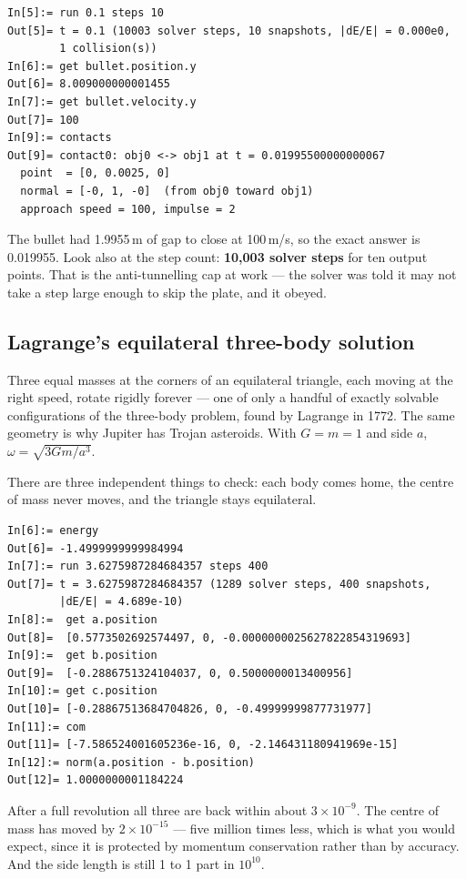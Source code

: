 \documentclass[11pt]{article}
\begin{document}
\begin{lstlisting}
In[5]:= run 0.1 steps 10
Out[5]= t = 0.1 (10003 solver steps, 10 snapshots, |dE/E| = 0.000e0,
        1 collision(s))
In[6]:= get bullet.position.y
Out[6]= 8.009000000001455
In[7]:= get bullet.velocity.y
Out[7]= 100
In[9]:= contacts
Out[9]= contact0: obj0 <-> obj1 at t = 0.01995500000000067
  point  = [0, 0.0025, 0]
  normal = [-0, 1, -0]  (from obj0 toward obj1)
  approach speed = 100, impulse = 2
\end{lstlisting}

The bullet had 1.9955\,m of gap to close at 100\,m/s, so the exact
answer is 0.019955. Look also at the step count: \textbf{10{,}003 solver
steps} for ten output points. That is the anti-tunnelling cap at work
--- the solver was told it may not take a step large enough to skip the
plate, and it obeyed.

\subsection{Lagrange's equilateral three-body solution}

Three equal masses at the corners of an equilateral triangle, each
moving at the right speed, rotate rigidly forever --- one of only a
handful of exactly solvable configurations of the three-body problem,
found by Lagrange in 1772. The same geometry is why Jupiter has Trojan
asteroids. With $G=m=1$ and side $a$, $\omega = \sqrt{3Gm/a^3}$.

There are three independent things to check: each body comes home, the
centre of mass never moves, and the triangle stays equilateral.

\begin{lstlisting}
In[6]:= energy
Out[6]= -1.4999999999984994
In[7]:= run 3.6275987284684357 steps 400
Out[7]= t = 3.6275987284684357 (1289 solver steps, 400 snapshots,
        |dE/E| = 4.689e-10)
In[8]:=  get a.position
Out[8]=  [0.5773502692574497, 0, -0.0000000025627822854319693]
In[9]:=  get b.position
Out[9]=  [-0.2886751324104037, 0, 0.5000000013400956]
In[10]:= get c.position
Out[10]= [-0.28867513684704826, 0, -0.49999999877731977]
In[11]:= com
Out[11]= [-7.586524001605236e-16, 0, -2.146431180941969e-15]
In[12]:= norm(a.position - b.position)
Out[12]= 1.0000000001184224
\end{lstlisting}

After a full revolution all three are back within about
$3\times10^{-9}$. The centre of mass has moved by $2\times10^{-15}$ ---
five million times less, which is what you would expect, since it is
protected by momentum conservation rather than by accuracy. And the side
length is still 1 to 1 part in $10^{10}$.
\end{document}

